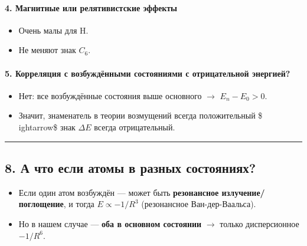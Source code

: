 \documentclass[11pt]{article}
\providecommand{\tightlist}{%
      \setlength{\itemsep}{0pt}\setlength{\parskip}{0pt}}
\begin{document}
\paragraph{\texorpdfstring{4. \textbf{Магнитные или релятивистские
эффекты}}{4. Магнитные или релятивистские эффекты}}\label{ux43cux430ux433ux43dux438ux442ux43dux44bux435-ux438ux43bux438-ux440ux435ux43bux44fux442ux438ux432ux438ux441ux442ux441ux43aux438ux435-ux44dux444ux444ux435ux43aux442ux44b}

\begin{itemize}
\tightlist
\item
  Очень малы для H.
\item
  Не меняют знак \(C_6\).
\end{itemize}

\paragraph{\texorpdfstring{5. \textbf{Корреляция с возбуждёнными
состояниями с отрицательной
энергией?}}{5. Корреляция с возбуждёнными состояниями с отрицательной энергией?}}\label{ux43aux43eux440ux440ux435ux43bux44fux446ux438ux44f-ux441-ux432ux43eux437ux431ux443ux436ux434ux451ux43dux43dux44bux43cux438-ux441ux43eux441ux442ux43eux44fux43dux438ux44fux43cux438-ux441-ux43eux442ux440ux438ux446ux430ux442ux435ux43bux44cux43dux43eux439-ux44dux43dux435ux440ux433ux438ux435ux439}

\begin{itemize}
\tightlist
\item
  Нет: все возбуждённые состояния выше основного $\rightarrow$
  \(E_n - E_0 > 0\).
\item
  Значит, знаменатель в теории возмущений всегда положительный \$
  ightarrow\$ знак \(\Delta E\) всегда отрицательный.
\end{itemize}

\begin{center}\rule{0.5\linewidth}{\linethickness}\end{center}

\subsection{8. А что если атомы в разных
состояниях?}\label{ux430-ux447ux442ux43e-ux435ux441ux43bux438-ux430ux442ux43eux43cux44b-ux432-ux440ux430ux437ux43dux44bux445-ux441ux43eux441ux442ux43eux44fux43dux438ux44fux445}

\begin{itemize}
\tightlist
\item
  Если один атом возбуждён --- может быть \textbf{резонансное
  излучение/поглощение}, и тогда \(E \propto -1/R^3\) (резонансное
  Ван-дер-Ваальса).
\item
  Но в нашем случае --- \textbf{оба в основном состоянии} $\rightarrow$
  только дисперсионное \(-1/R^6\).
\end{itemize}
\end{document}
